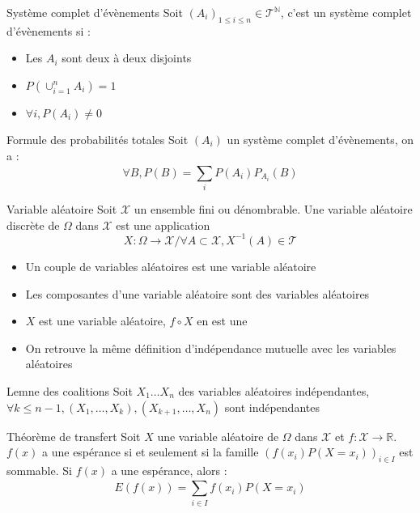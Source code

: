 \documentclass[french, a4paper, 10pt, twocolumn]{article}
\newcommand{\N}{\mathbb{N}}   %
\newcommand{\R}{\mathbb{R}}   %
\begin{document}
\begin{definition}{Système complet d'évènements}
    Soit \((A_i)_{1 \leq i \leq n} \in \mathcal{T}^{\N}\), c'est un système complet d'évènements si :
    \begin{itemize}
        \item Les \(A_i\) sont deux à deux disjoints
        \item \(P(\cup_{i=1}^{n}A_i)=1\)
        \item \(\forall i, P(A_i)\neq 0\)
    \end{itemize}
\end{definition}

\begin{theoreme}{Formule des probabilités totales}
    Soit $(A_i)$ un système complet d'évènements, on a :
        \[\forall B, P(B)=\sum_{i}^{}P(A_i)P_{A_i}(B)\]
\end{theoreme}

\begin{definition}{Variable aléatoire}
    Soit \(\mathcal{X}\) un ensemble fini ou dénombrable.
    Une variable aléatoire discrète de \(\Omega\) dans \(\mathcal{X}\) est une application
        \[X : \Omega \rightarrow \mathcal{X} / \forall A \subset \mathcal{X}, X^{-1}(A) \in \mathcal{T}\]
    
    \tcblower
    \begin{itemize}
        \item Un couple de variables aléatoires est une variable aléatoire
        \item Les composantes d'une variable aléatoire sont des variables aléatoires
        \item \(X\) est une variable aléatoire, \(f\circ X\) en est une
        \item On retrouve la même définition d'indépendance mutuelle avec les variables aléatoires
    \end{itemize}
\end{definition}

\begin{theoreme}{Lemne des coalitions}
    Soit \(X_1\dots X_n\) des variables aléatoires indépendantes,
    \(\forall k \leq n-1, (X_1,\dots,X_k),(X_{k+1},\dots,X_n)\) sont indépendantes
\end{theoreme}

\begin{theoreme}{Théorème de transfert}
    Soit \(X\) une variable aléatoire de \(\Omega\) dans \(\mathcal{X}\) et \(f : \mathcal{X} \rightarrow \R\).
    \(f(x)\) a une espérance si et seulement si la famille \((f(x_i)P(X=x_i))_{i\in I}\) est sommable.
    Si \(f(x)\) a une espérance, alors : 
        \[E(f(x))=\sum_{i\in I}^{}f(x_i)P(X=x_i)\]
\end{theoreme}
\end{document}

